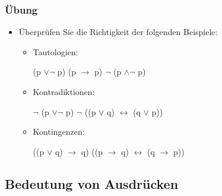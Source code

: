 \begin{frame}
\frametitle{Übung}

\begin{itemize}
	\item Überprüfen Sie die Richtigkeit der folgenden Beispiele:
	
	\vspace{1em}
	
	\begin{itemize}
		\item Tautologien:
	
		\eal
			\ex (p $\lor \lnot$ p)
			\ex (p $\rightarrow$ p)
			\ex $\lnot$ (p $\land \lnot$ p)
		\zl
			
		\item Kontradiktionen:
		
		\eal
			\ex $\lnot$ (p $\lor \lnot$ p)
			\ex $\lnot$ ((p $\lor$ q) $\leftrightarrow$ (q $\lor$ p))
		\zl

		\item Kontingenzen:
		
		\eal
			\ex ((p $\lor$ q) $\rightarrow$ q)
			\ex ((p $\rightarrow$ q) $\leftrightarrow$ (q $\rightarrow$ p))
		\zl
			
	\end{itemize}	
	
\end{itemize}

\end{frame}


\author{Stefan Müller}

\subsection{Bedeutung von Ausdrücken}

